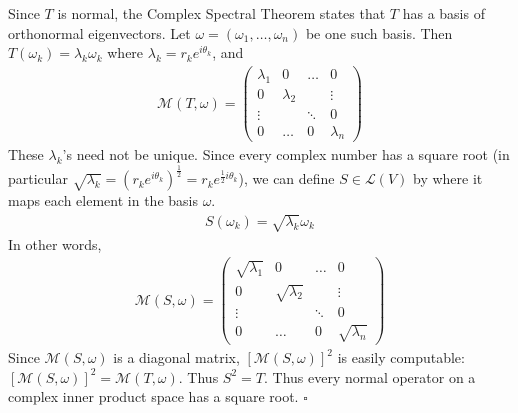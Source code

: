 \documentclass[12pt]{article}
\begin{document}
\noindent Since $T$ is normal, the Complex Spectral Theorem states that $T$ has a basis of orthonormal eigenvectors.  Let $\omega = (\omega_1, \dots, \omega_n)$ be one such basis.  Then $T(\omega_k) = \lambda_k\omega_k$ where $\lambda_k = r_ke^{i\theta_k}$, and
\begin{align*}
		\mathcal{M}(T, \omega) = \left(\begin{array}{cccc}
				\lambda_1 & 0 & \dots & 0 \\
				0 & \lambda_2 & & \vdots \\
				\vdots & & \ddots & 0 \\
				0 & \dots & 0 & \lambda_n
		\end{array}\right)
\end{align*}
These $\lambda_k$'s need not be unique.  Since every complex number has a square root (in particular $\sqrt{\lambda_k} = (r_ke^{i\theta_k})^{\frac{1}{2}} = r_ke^{\frac{1}{2}i\theta_k}$), we can define $S \in \mathcal{L}(V)$ by where it maps each element in the basis $\omega$.
\begin{align*}
		S(\omega_k) = \sqrt{\lambda_k}\omega_k
\end{align*}
In other words,
\begin{align*}
		\mathcal{M}(S, \omega) = \left(\begin{array}{cccc}
				\sqrt{\lambda_1} & 0 & \dots & 0 \\
				0 & \sqrt{\lambda_2} & & \vdots \\
				\vdots & & \ddots & 0 \\
				0 & \dots & 0 & \sqrt{\lambda_n}
		\end{array}\right)
\end{align*}
Since $\mathcal{M}(S, \omega)$ is a diagonal matrix, $[\mathcal{M}(S, \omega)]^2$ is easily computable: $[\mathcal{M}(S, \omega)]^2 = \mathcal{M}(T, \omega)$.  Thus $S^2 = T$.  Thus every normal operator on a complex inner product space has a square root. \hfill $\square$
\end{document}
